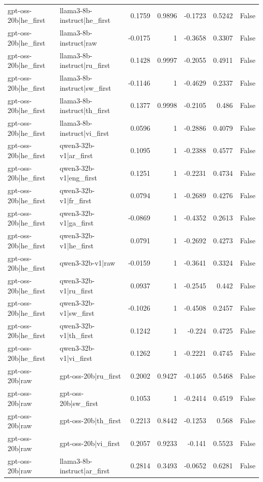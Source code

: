 \begin{table}
\begin{tabular}{l l r r r r l}
gpt-oss-20b|he_first & llama3-8b-instruct|he_first & 0.1759 & 0.9896 & -0.1723 & 0.5242 & False \\
gpt-oss-20b|he_first & llama3-8b-instruct|raw & -0.0175 & 1 & -0.3658 & 0.3307 & False \\
gpt-oss-20b|he_first & llama3-8b-instruct|ru_first & 0.1428 & 0.9997 & -0.2055 & 0.4911 & False \\
gpt-oss-20b|he_first & llama3-8b-instruct|sw_first & -0.1146 & 1 & -0.4629 & 0.2337 & False \\
gpt-oss-20b|he_first & llama3-8b-instruct|th_first & 0.1377 & 0.9998 & -0.2105 & 0.486 & False \\
gpt-oss-20b|he_first & llama3-8b-instruct|vi_first & 0.0596 & 1 & -0.2886 & 0.4079 & False \\
gpt-oss-20b|he_first & qwen3-32b-v1|ar_first & 0.1095 & 1 & -0.2388 & 0.4577 & False \\
gpt-oss-20b|he_first & qwen3-32b-v1|eng_first & 0.1251 & 1 & -0.2231 & 0.4734 & False \\
gpt-oss-20b|he_first & qwen3-32b-v1|fr_first & 0.0794 & 1 & -0.2689 & 0.4276 & False \\
gpt-oss-20b|he_first & qwen3-32b-v1|ga_first & -0.0869 & 1 & -0.4352 & 0.2613 & False \\
gpt-oss-20b|he_first & qwen3-32b-v1|he_first & 0.0791 & 1 & -0.2692 & 0.4273 & False \\
gpt-oss-20b|he_first & qwen3-32b-v1|raw & -0.0159 & 1 & -0.3641 & 0.3324 & False \\
gpt-oss-20b|he_first & qwen3-32b-v1|ru_first & 0.0937 & 1 & -0.2545 & 0.442 & False \\
gpt-oss-20b|he_first & qwen3-32b-v1|sw_first & -0.1026 & 1 & -0.4508 & 0.2457 & False \\
gpt-oss-20b|he_first & qwen3-32b-v1|th_first & 0.1242 & 1 & -0.224 & 0.4725 & False \\
gpt-oss-20b|he_first & qwen3-32b-v1|vi_first & 0.1262 & 1 & -0.2221 & 0.4745 & False \\
gpt-oss-20b|raw & gpt-oss-20b|ru_first & 0.2002 & 0.9427 & -0.1465 & 0.5468 & False \\
gpt-oss-20b|raw & gpt-oss-20b|sw_first & 0.1053 & 1 & -0.2414 & 0.4519 & False \\
gpt-oss-20b|raw & gpt-oss-20b|th_first & 0.2213 & 0.8442 & -0.1253 & 0.568 & False \\
gpt-oss-20b|raw & gpt-oss-20b|vi_first & 0.2057 & 0.9233 & -0.141 & 0.5523 & False \\
gpt-oss-20b|raw & llama3-8b-instruct|ar_first & 0.2814 & 0.3493 & -0.0652 & 0.6281 & False \\

\end{tabular}
\end{table}
